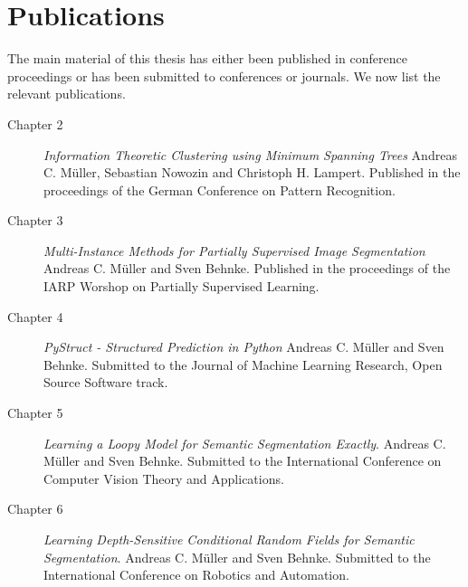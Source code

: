 \section{Publications}
The main material of this thesis has either been published in conference
proceedings or has been submitted to conferences or journals. We now list the
relevant publications.
\begin{description}
    \item[Chapter 2] \emph{Information Theoretic Clustering using Minimum Spanning Trees} Andreas C. M\"uller, Sebastian Nowozin and Christoph H. Lampert. Published in the proceedings of the German Conference on Pattern Recognition.
    \item[Chapter 3] \emph{Multi-Instance Methods for Partially Supervised Image Segmentation} Andreas C. M\"uller and Sven Behnke. Published in the proceedings of the IARP Worshop on Partially Supervised Learning.
    \item[Chapter 4] \emph{PyStruct - Structured Prediction in Python} Andreas C. M\"uller and Sven Behnke. Submitted to the Journal of Machine Learning Research, Open Source Software track.
    \item[Chapter 5] \emph{Learning a Loopy Model for Semantic Segmentation Exactly}. Andreas C. M\"uller and Sven Behnke. Submitted to the International Conference on Computer Vision Theory and Applications.
    \item[Chapter 6] \emph{Learning Depth-Sensitive Conditional Random Fields for Semantic Segmentation}. Andreas C. M\"uller and Sven Behnke. Submitted to the International Conference on Robotics and Automation.
\end{description}
